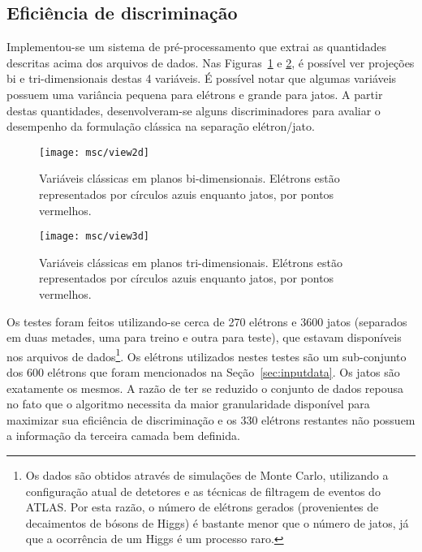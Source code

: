 \subsection{Eficiência de discriminação}
\label{sec:eff-classical}

Implementou-se um sistema de pré-processamento que extrai as quantidades
descritas acima dos arquivos de dados. Nas Figuras~\ref{fig:dados-2d} e
\ref{fig:dados-3d}, é possível ver projeções bi e tri-dimensionais destas 4
variáveis. É possível notar que algumas variáveis possuem uma variância
pequena para elétrons e grande para jatos. A partir destas quantidades,
desenvolveram-se alguns discriminadores para avaliar o desempenho da
formulação clássica na separação elétron/jato.

\begin{figure}
\begin{center}
\texttt{[image: msc/view2d]}
\end{center}
\caption[Variáveis clássicas em planos bi-dimensionais.]{Variáveis clássicas em
planos bi-dimensionais. Elétrons estão representados por círculos azuis
enquanto jatos, por pontos vermelhos.}
\label{fig:dados-2d}
\end{figure}

\begin{figure}
\begin{center}
\texttt{[image: msc/view3d]}
\end{center}
\caption[Variáveis clássicas em planos tri-dimensionais.]{Variáveis clássicas
em planos tri-dimensionais. Elétrons estão representados por círculos azuis
enquanto jatos, por pontos vermelhos.}
\label{fig:dados-3d}
\end{figure}

Os testes foram feitos utilizando-se cerca de 270 elétrons e 3600 jatos
(separados em duas metades, uma para treino e outra para teste), que estavam
disponíveis nos arquivos de dados\footnote{Os dados são obtidos através de
simulações de Monte Carlo, utilizando a configuração atual de detetores e as
técnicas de filtragem de eventos do ATLAS. Por esta razão, o número de
elétrons gerados (provenientes de decaimentos de bósons de Higgs) é bastante
menor que o número de jatos, já que a ocorrência de um Higgs é um processo
raro.}. Os elétrons utilizados nestes testes são um sub-conjunto dos 600
elétrons que foram mencionados na Seção~\ref{sec:inputdata}. Os jatos são
exatamente os mesmos. A razão de ter se reduzido o conjunto de dados repousa
no fato que o algoritmo necessita da maior granularidade disponível para
maximizar sua eficiência de discriminação e os 330 elétrons restantes não
possuem a informação da terceira camada bem definida.

